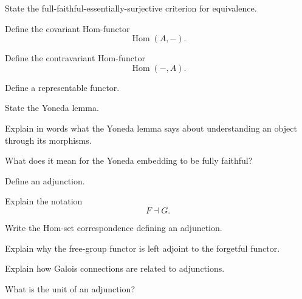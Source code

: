 \begin{exercise}[2]
State the full-faithful-essentially-surjective criterion for equivalence.
\end{exercise}

\begin{exercise}[1]
Define the covariant Hom-functor
\[ \operatorname{Hom}(A,-). \]
\end{exercise}

\begin{exercise}[1]
Define the contravariant Hom-functor
\[ \operatorname{Hom}(-,A). \]
\end{exercise}

\begin{exercise}[1]
Define a representable functor.
\end{exercise}

\begin{exercise}[2]
State the Yoneda lemma.
\end{exercise}

\begin{exercise}[2]
Explain in words what the Yoneda lemma says about understanding an object
through its morphisms.
\end{exercise}

\begin{exercise}[2]
What does it mean for the Yoneda embedding to be fully faithful?
\end{exercise}

\begin{exercise}[1]
Define an adjunction.
\end{exercise}

\begin{exercise}[1]
Explain the notation
\[ F\dashv G. \]
\end{exercise}

\begin{exercise}[2]
Write the Hom-set correspondence defining an adjunction.
\end{exercise}

\begin{exercise}[2]
Explain why the free-group functor is left adjoint to the forgetful functor.
\end{exercise}

\begin{exercise}[2]
Explain how Galois connections are related to adjunctions.
\end{exercise}

\begin{exercise}[1]
What is the unit of an adjunction?
\end{exercise}


